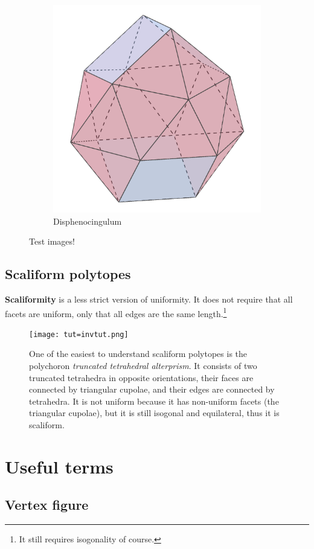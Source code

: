 \documentclass{article}
\begin{document}
\begin{figure}[h]
\begin{subfigure}{.33333\textwidth}
    \centering
    \includegraphics[width=.5\linewidth]{Disphenocingulum}
    \caption{Disphenocingulum}
    \label{fig:polyhedra_3}
  \end{subfigure}%
  \caption{Test images!}
  \label{fig:crf_polyhedra}
\end{figure}

\subsection{Scaliform polytopes}
\label{scaliform}

\textbf{Scaliformity} is a less strict version of uniformity. It does not require that
all facets are uniform, only that all edges are the same length.\footnote{
  It still requires isogonality of course.}

\begin{figure}[H]
  \centering
  \texttt{[image: tut=invtut.png]}
  \caption{One of the easiest to understand scaliform polytopes is the polychoron
    \textit{truncated tetrahedral alterprism}. It consists of two truncated tetrahedra
    in opposite orientations, their faces are connected by triangular cupolae, and
    their edges are connected by tetrahedra. It is not uniform because it has non-uniform
    facets (the triangular cupolae), but it is still isogonal and equilateral, thus it is
    scaliform.}
\end{figure}

\section{Useful terms}

\subsection{Vertex figure}
\label{verf}
\end{document}
